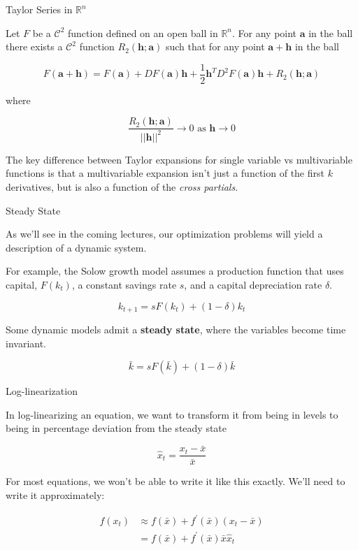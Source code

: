 \documentclass[11pt, xcolor={dvipsnames}, hyperref={colorlinks, allcolors=Blue}]{beamer}
\newcommand\bc[1]{{\usebeamercolor[fg]{frametitle} {\textbf{#1}}}} %
\newcommand{\R}{\mathbb{R}}
\renewcommand{\a}{\mathbf{a}}
\newcommand{\h}{\mathbf{h}}
\begin{document}
\begin{frame}{Taylor Series in $\R^{n}$}

\begin{theorem}
Let $F$ be a $\mathcal{C}^{2}$ function defined on an open ball in $\R^{n}$. For any point $\a$ in the ball there exists a $\mathcal{C}^{2}$ function $R_{2}(\h;\a)$ such that for any point $\a + \h$ in the ball

\[F(\a + \h) = F(\a) + DF(\a) \h + \frac{1}{2}\h^{T}D^{2}F(\a)\h + R_{2}(\h;\a)\]

where

\[ \frac{R_{2}(\h;\a)}{||\h||^{2}} \rightarrow 0 \text{  as  } \h \rightarrow 0\]
\end{theorem}
\bigskip

The key difference between Taylor expansions for single variable vs multivariable functions is that a multivariable expansion isn't just a function of the first $k$ derivatives, but is also a function of the \emph{cross partials}.
\vfill\vfill

\end{frame}

\begin{frame}{Steady State}

As we'll see in the coming lectures, our optimization problems will yield a description of a dynamic system.\bigskip

For example, the Solow growth model assumes a production function that uses capital, $F(k_{t})$, a constant savings rate $s$, and a capital depreciation rate $\delta$.

\[k_{t+1} = sF(k_{t}) + (1-\delta) k_{t}\]

Some dynamic models admit a \bc{steady state}, where the variables become time invariant.

\[\bar{k} = sF(\bar{k}) + (1-\delta)\bar{k}\]

\end{frame}

\begin{frame}{Log-linearization}

In log-linearizing an equation, we want to transform it from being in levels to being in percentage deviation from the steady state

\[\hat{x}_{t} = \frac{x_{t} - \bar{x}}{\bar{x}}\]
\bigskip

For most equations, we won't be able to write it like this exactly. We'll need to write it approximately:

\begin{align*}
f(x_{t}) &\approx f(\bar{x}) + f^{\prime}(\bar{x}) (x_{t} - \bar{x})\\
&= f(\bar{x}) + f^{\prime}(\bar{x})\bar{x} \hat{x}_{t}
\end{align*}
\end{frame}
\end{document}
